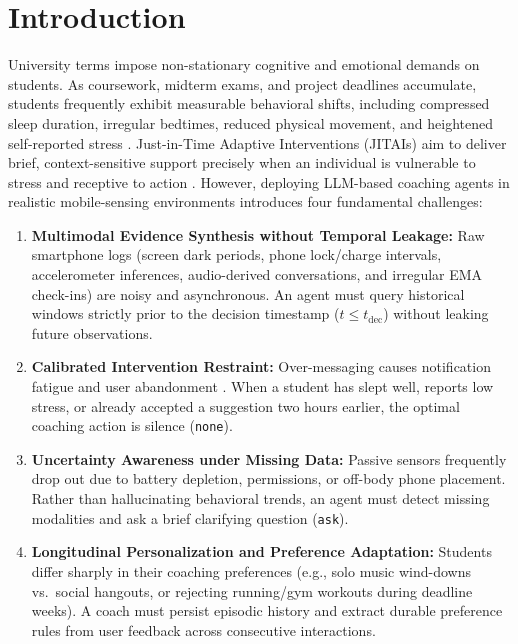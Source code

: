 \documentclass{article}
\begin{document}
\section{Introduction}
\label{sec:intro}

University terms impose non-stationary cognitive and emotional demands on students. As coursework, midterm exams, and project deadlines accumulate, students frequently exhibit measurable behavioral shifts, including compressed sleep duration, irregular bedtimes, reduced physical movement, and heightened self-reported stress \cite{wang2014studentlife}. Just-in-Time Adaptive Interventions (JITAIs) aim to deliver brief, context-sensitive support precisely when an individual is vulnerable to stress and receptive to action \cite{nahum2018jitai}. However, deploying LLM-based coaching agents in realistic mobile-sensing environments introduces four fundamental challenges:
\begin{enumerate}
  \item \textbf{Multimodal Evidence Synthesis without Temporal Leakage:} Raw smartphone logs (screen dark periods, phone lock/charge intervals, accelerometer inferences, audio-derived conversations, and irregular EMA check-ins) are noisy and asynchronous. An agent must query historical windows strictly prior to the decision timestamp ($t \le t_{\text{dec}}$) without leaking future observations.
  \item \textbf{Calibrated Intervention Restraint:} Over-messaging causes notification fatigue and user abandonment \cite{nahum2018jitai}. When a student has slept well, reports low stress, or already accepted a suggestion two hours earlier, the optimal coaching action is silence (\texttt{none}).
  \item \textbf{Uncertainty Awareness under Missing Data:} Passive sensors frequently drop out due to battery depletion, permissions, or off-body phone placement. Rather than hallucinating behavioral trends, an agent must detect missing modalities and ask a brief clarifying question (\texttt{ask}).
  \item \textbf{Longitudinal Personalization and Preference Adaptation:} Students differ sharply in their coaching preferences (e.g., solo music wind-downs vs.\ social hangouts, or rejecting running/gym workouts during deadline weeks). A coach must persist episodic history and extract durable preference rules from user feedback across consecutive interactions.
\end{enumerate}
\end{document}
